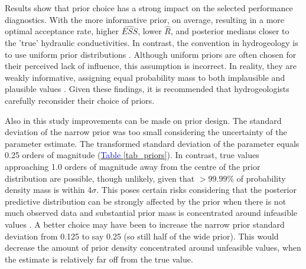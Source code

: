 Results show that prior choice has a strong impact on the selected performance diagnostics. With the more informative prior, on average, resulting in a more optimal acceptance rate, higher $\widehat{ESS}$, lower $\hat{R}$, and posterior medians closer to the 'true' hydraulic conductivities. In contrast, the convention in hydrogeology is to use uniform prior distributions \citep{laloy2012high, keating2010optimization}. 
Although uniform priors are often chosen for their perceived lack of influence, this assumption is incorrect. In reality, they are weakly informative, assigning equal probability mass to both implausible and plausible values \citep{gelman2020holes}. Given these findings, it is recommended that hydrogeologists carefully reconsider their choice of priors.

Also in this study improvements can be made on prior design. The standard deviation of the narrow prior was too small considering the uncertainty of the parameter estimate. The transformed standard deviation of the parameter equals 0.25 orders of magnitude (\hyperref[tab_priors]{\textcolor{blue}{Table }\ref{tab_priors}}). In contrast, true values approaching 1.0 orders of magnitude away from the centre of the prior distribution are possible, though unlikely, given that $>99.99\%$ of probability density mass is within 4$\sigma$. %
This poses certain risks considering that the posterior predictive distribution can be strongly affected by the prior when there is not much observed data and substantial prior mass is concentrated around infeasible values \citep{gelman2006prior}. A better choice may have been to increase the narrow prior standard deviation from 0.125 to say 0.25 (so still half of the wide prior). This would decrease the amount of prior density concentrated around unfeasible values, when the estimate is relatively far off from the true value. 

